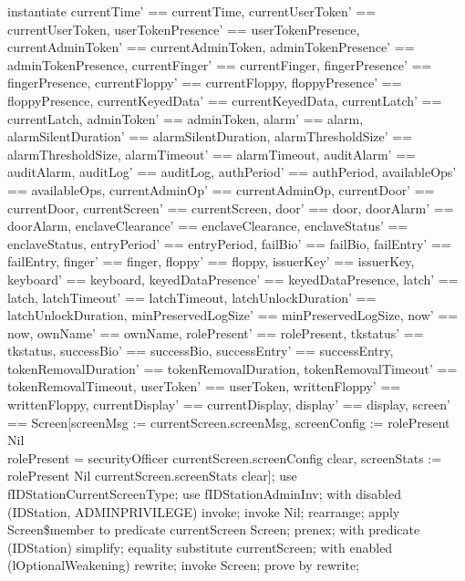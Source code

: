 \begin{zproof}[tUpdateScreenPRE]
instantiate
  currentTime' == currentTime, currentUserToken' == currentUserToken,
  userTokenPresence' == userTokenPresence,
  currentAdminToken' == currentAdminToken,
  adminTokenPresence' == adminTokenPresence, currentFinger' == currentFinger,
  fingerPresence' == fingerPresence, currentFloppy' == currentFloppy,
  floppyPresence' == floppyPresence, currentKeyedData' == currentKeyedData,
  currentLatch' == currentLatch, adminToken' == adminToken, alarm' == alarm,
  alarmSilentDuration' == alarmSilentDuration,
  alarmThresholdSize' == alarmThresholdSize, alarmTimeout' == alarmTimeout,
  auditAlarm' == auditAlarm, auditLog' == auditLog, authPeriod' == authPeriod,
  availableOps' == availableOps, currentAdminOp' == currentAdminOp,
  currentDoor' == currentDoor, currentScreen' == currentScreen, door' == door,
  doorAlarm' == doorAlarm, enclaveClearance' == enclaveClearance,
  enclaveStatus' == enclaveStatus, entryPeriod' == entryPeriod,
  failBio' == failBio, failEntry' == failEntry, finger' == finger,
  floppy' == floppy, issuerKey' == issuerKey, keyboard' == keyboard,
  keyedDataPresence' == keyedDataPresence, latch' == latch,
  latchTimeout' == latchTimeout, latchUnlockDuration' == latchUnlockDuration,
  minPreservedLogSize' == minPreservedLogSize, now' == now,
  ownName' == ownName, rolePresent' == rolePresent, tkstatus' == tkstatus,
  successBio' == successBio, successEntry' == successEntry,
  tokenRemovalDuration' == tokenRemovalDuration,
  tokenRemovalTimeout' == tokenRemovalTimeout, userToken' == userToken,
  writtenFloppy' == writtenFloppy, currentDisplay' == currentDisplay,
  display' == display,
  screen'
    == \theta
         Screen[screenMsg := currentScreen.screenMsg,
                screenConfig
                  := \IF       rolePresent \neq Nil \\
                         \land \The rolePresent = securityOfficer
                     \THEN currentScreen.screenConfig
                     \ELSE clear,
                screenStats
                  := \IF rolePresent \neq Nil
                     \THEN currentScreen.screenStats
                     \ELSE clear];
use fIDStationCurrentScreenType;
use fIDStationAdminInv;
with disabled (IDStation, ADMINPRIVILEGE) invoke;
invoke Nil;
rearrange;
apply Screen\$member to predicate currentScreen \in Screen;
prenex;
with predicate (IDStation) simplify;
equality substitute currentScreen;
with enabled (lOptionalWeakening) rewrite;
invoke Screen;
prove by rewrite;
\end{zproof}

